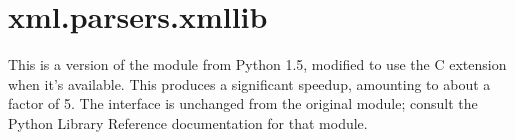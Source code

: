 \documentclass{howto}
\begin{document}
\section{xml.parsers.xmllib}

This is a version of the  module from Python 1.5,
modified to use the  C extension when it's available.
This produces a significant speedup, amounting to about a factor of 5.
The interface is unchanged from the original  module;
consult the Python Library Reference documentation for that module.




\end{document}

